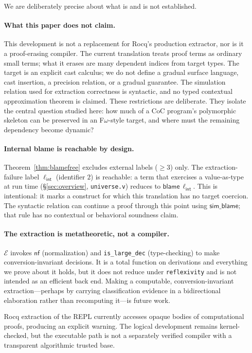 \documentclass[acmsmall,anonymous=false,nonacm]{acmart}
\newcommand{\blame}[1]{\mathsf{blame}\,#1}
\newcommand{\ext}{\mathcal{E}}
\newcommand{\nf}{\mathsf{nf}}
\newcommand{\lint}{\ell_{\mathsf{int}}}
\begin{document}
We are deliberately precise about what is and is not established.

\paragraph{What this paper does not claim.}
This development is not a replacement for Rocq's production extractor, nor is it
a proof-erasing compiler.  The current translation treats proof terms as ordinary
small terms; what it erases are many dependent indices from target types.  The
target is an explicit cast calculus; we do not define a gradual surface
language, cast insertion, a precision relation, or a gradual guarantee. The
simulation relation used for extraction correctness is syntactic, and no typed
contextual approximation theorem is claimed. These restrictions are
deliberate.  They isolate the central question studied here: how much of a CoC
program's polymorphic skeleton can be preserved in an F$\omega$-style target, and
where must the remaining dependency become dynamic?

\paragraph{Internal blame is reachable by design.}
Theorem~\ref{thm:blamefree} excludes external labels ($\ge 3$) only. The
extraction-failure label $\lint$ (identifier $2$) is reachable: a term that exercises a
value-as-type at run time (\S\ref{sec:overview}, \texttt{universe.v}) reduces to
$\blame \lint$. This is intentional: it marks a construct for which this
translation has no target coercion. The syntactic relation can continue a proof through this point using
$\mathsf{sim\_blame}$; that rule has no contextual or behavioral soundness claim.

\paragraph{The extraction is metatheoretic, not a compiler.}
$\ext$ invokes $\nf$ (normalization) and \texttt{is\_large\_dec} (type-checking)
to make conversion-invariant decisions. It is a total function on derivations
and everything we prove about it holds, but it does not reduce under
\texttt{reflexivity} and is not intended as an efficient back end. Making a
computable, conversion-invariant extraction---perhaps by carrying classification
evidence in a bidirectional elaboration rather than recomputing it---is future
work.

Rocq extraction of the REPL currently accesses opaque bodies of computational
proofs, producing an explicit warning. The logical development remains
kernel-checked, but the executable path is not a separately verified compiler
with a transparent algorithmic trusted base.
\end{document}

